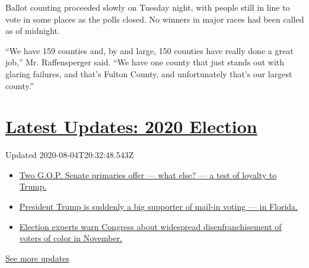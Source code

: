 Ballot counting proceeded slowly on Tuesday night, with people still in
line to vote in some places as the polls closed. No winners in major
races had been called as of midnight.

``We have 159 counties and, by and large, 150 counties have really done
a great job,'' Mr. Raffensperger said. ``We have one county that just
stands out with glaring failures, and that's Fulton County, and
unfortunately that's our largest county.''

\hypertarget{latest-updates-2020-election}{%
\section{\texorpdfstring{\href{https://www.nytimes.com/2020/08/04/us/elections/primary-election-michigan-arizona-kansas.html?action=click\&pgtype=Article\&state=default\&region=MAIN_CONTENT_1\&context=storylines_live_updates}{Latest
Updates: 2020
Election}}{Latest Updates: 2020 Election}}\label{latest-updates-2020-election}}

Updated 2020-08-04T20:32:48.543Z

\begin{itemize}
\tightlist
\item
  \href{https://www.nytimes.com/2020/08/04/us/elections/primary-election-michigan-arizona-kansas.html?action=click\&pgtype=Article\&state=default\&region=MAIN_CONTENT_1\&context=storylines_live_updates\#link-3924dd44}{Two
  G.O.P. Senate primaries offer --- what else? --- a test of loyalty to
  Trump.}
\item
  \href{https://www.nytimes.com/2020/08/04/us/elections/primary-election-michigan-arizona-kansas.html?action=click\&pgtype=Article\&state=default\&region=MAIN_CONTENT_1\&context=storylines_live_updates\#link-32b39e33}{President
  Trump is suddenly a big supporter of mail-in voting --- in Florida.}
\item
  \href{https://www.nytimes.com/2020/08/04/us/elections/primary-election-michigan-arizona-kansas.html?action=click\&pgtype=Article\&state=default\&region=MAIN_CONTENT_1\&context=storylines_live_updates\#link-6d019753}{Election
  experts warn Congress about widespread disenfranchisement of voters of
  color in November.}
\end{itemize}

\href{https://www.nytimes.com/2020/08/04/us/elections/primary-election-michigan-arizona-kansas.html?action=click\&pgtype=Article\&state=default\&region=MAIN_CONTENT_1\&context=storylines_live_updates}{See
more updates}

